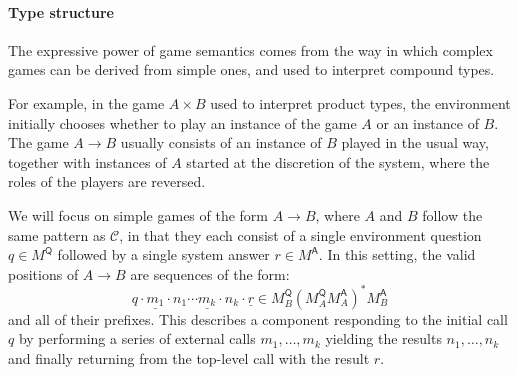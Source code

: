 \documentclass[sigplan,10pt,review,anonymous]{acmart}
\newcommand{\kw}[1]{\ensuremath{ \mathsf{#1} }}
\begin{document}


\paragraph{Type structure} \label{sec:mainideas:gs:types} %

The expressive power of game semantics
comes from the way in which complex games can be derived from simple ones,
and used to interpret compound types.

For example,
in the game $A \times B$ used to interpret product types,
the environment initially chooses whether to play
an instance of the game $A$ or an instance of $B$.
The game $A \rightarrow B$ usually consists of
an instance of $B$ played in the usual way,
together with instances of $A$
started at the discretion of the system,
where the roles of the players are reversed.

We will focus on simple games of the form $A \rightarrow B$,
where $A$ and $B$ follow the same pattern as $\mathcal{C}$,
in that they each consist of a single environment question
$q \in M^\kw{Q}$
followed by a single system answer
$r \in M^\kw{A}$.
In this setting,
the valid positions of $A \rightarrow B$ are
sequences of the form:
\[
  q \cdot \underline{m_1} \cdot n_1 \cdots
          \underline{m_k} \cdot n_k \cdot \underline{r} \in
  M_B^\kw{Q} ( {M_A^\kw{Q}} M_A^\kw{A} )^* {M_B^\kw{A}}
\]
and all of their prefixes.
This describes a component responding to
the initial call $q$ by
performing a series of external calls $m_1, \ldots, m_k$
yielding the results $n_1, \ldots, n_k$
and finally returning from the top-level call
with the result $r$.


\end{document}
